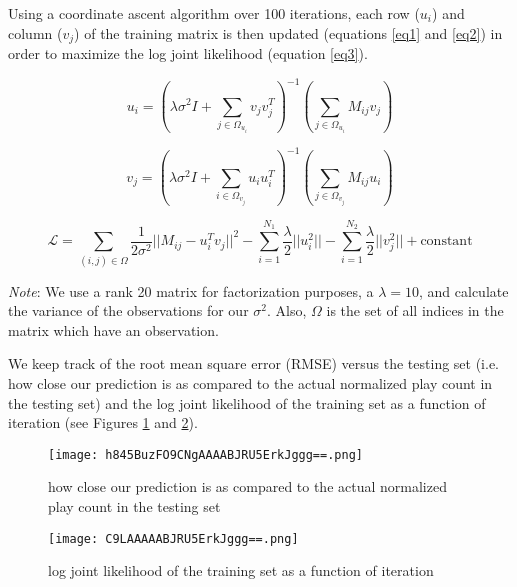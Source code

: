 \documentclass[12pt,preprint]{aastex}
\newcommand{\TRANSPOSE}{\ensuremath{T}}
\begin{document}
Using a coordinate ascent algorithm over 100 iterations, each row ($u_i$) and column ($v_j$) of the training matrix is then updated (equations \ref{eq1} and \ref{eq2}) in order to maximize the log joint likelihood (equation \ref{eq3}). 

\begin{equation}
u_i = \left( \lambda\sigma^2 I + \sum_{j \in \Omega_{u_i}} v_j v_j^\TRANSPOSE \right)^{-1}\left(\sum_{j \in \Omega_{u_i}} M_{ij} v_{j} \right)
\label{eq1}
\end{equation}


\begin{equation}
v_j = \left( \lambda\sigma^2 I + \sum_{i \in \Omega_{v_j}} u_i u_i^\TRANSPOSE  \right)^{-1}\left(\sum_{j \in \Omega_{v_j}} M_{ij} u_{i} \right)
\label{eq2}
\end{equation}


\begin{equation}
\mathcal{L} = \sum_{(i,j) \in \Omega} \frac{1}{2\sigma^2} {|| M_{ij} - u_i^\TRANSPOSE  v_j||}^2 - \sum_{i=1}^{N_1} \frac{\lambda}{2} ||u_i^2 || - \sum_{i=1}^{N_2} \frac{\lambda}{2} ||v_j^2 || + \text{constant}
\label{eq3} 
\end{equation}

\emph{Note}: We use a rank 20 matrix for factorization purposes, a $\lambda = 10$, and calculate the variance of the observations for our $\sigma^2$. Also, $\Omega$ is the set of all indices in the matrix which have an observation.

We keep track of the root mean square error (RMSE) versus the testing set (i.e. how close our prediction is as compared to the actual normalized play count in the testing set) and the log joint likelihood of the training set as a function of iteration (see Figures \ref{fig:rmseplot} and \ref{fig:likeplot}).


\begin{figure}[htbp] %
   \centering
   \texttt{[image: h845BuzFO9CNgAAAABJRU5ErkJggg==.png]} 
   \caption{how close our prediction is as compared to the actual normalized play count in the testing set }
   \label{fig:rmseplot}
\end{figure}

\begin{figure}[htbp] %
   \centering
   \texttt{[image: C9LAAAAABJRU5ErkJggg==.png]} 
   \caption{log joint likelihood of the training set as a function of iteration }
   \label{fig:likeplot}
\end{figure}
\end{document}
